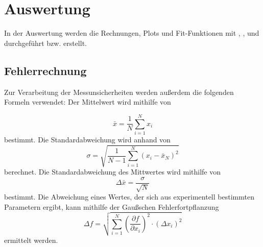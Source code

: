 \section{Auswertung}
\label{sec:Auswertung}
In der Auswertung werden die Rechnungen, Plots und Fit-Funktionen mit \cite{matplotlib}, \cite{numpy}, \cite{scipy} und \cite{uncertainties} durchgeführt bzw. erstellt.
\subsection{Fehlerrechnung}
\label{sec:fehlerrechnung}
Zur Verarbeitung der Messunsicherheiten werden außerdem die folgenden Formeln verwendet: 
Der Mittelwert wird mithilfe von

\begin{equation}
\bar{x} = \frac{1}{N} \sum_{i=1}^{N} x_i
\label{eqn:mittelwert}
\end{equation}
bestimmt.
Die Standardabweichung wird anhand von
\begin{equation}
\sigma = \sqrt{\frac{1}{N - 1} \sum_{i=1}^{N} \left( x_i - \bar{x}_N \right)^2}
\label{eqn:standardabweichung}
\end{equation}
berechnet.
Die Standardabweichung des Mittwertes wird mithilfe von 
\begin{equation}
\Delta \bar{x} = \frac{\sigma}{\sqrt{N}}
\label{eqn:standardmittelwert}
\end{equation}
bestimmt.
Die Abweichung eines Wertes, der sich aus experimentell bestimmten Parametern ergibt, kann mithilfe der Gaußschen Fehlerfortpflanzung 
\begin{equation}
\Delta f = \sqrt{\sum_{i=1}^{N} \left( \frac{\partial f}{\partial x_i} \right)^2 \cdot (\Delta x_i)^2}
\label{eqn:fehlerfortpflanzung}
\end{equation}
ermittelt werden.
\FloatBarrier
